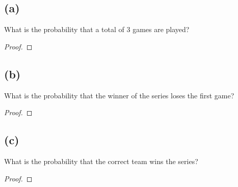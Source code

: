 \documentclass[14pt]{extarticle}
\begin{document}
\subsection{(a)}
What is the probability that a total of 3 games are played?
\begin{proof}
\end{proof}

\subsection{(b)}
What is the probability that the winner of the series loses the first game?
\begin{proof}
\end{proof}

\subsection{(c)}
What is the probability that the correct team wins the series?
\begin{proof}
\end{proof}
\end{document}
